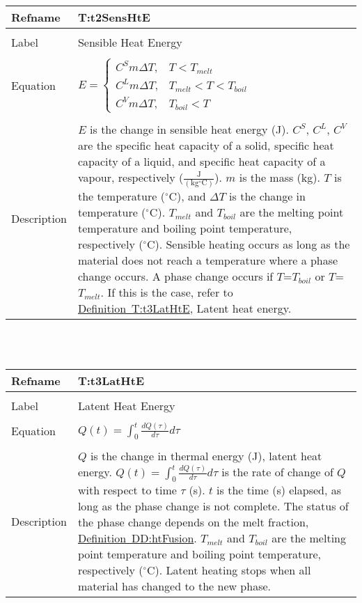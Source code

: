 \documentclass[12pt]{article}
\begin{document}
\noindent \begin{minipage}{\textwidth}
\begin{tabular}{p{} p{}}
\toprule \textbf{Refname} & \textbf{T:t2SensHtE}
\label{T:t2SensHtE}
\\ \midrule \\
Label & Sensible Heat Energy
\\ \midrule \\
Equation & $E=\begin{cases}
{C^{S}} m \Delta{}T, & T<{T_{melt}}\\
{C^{L}} m \Delta{}T, & {T_{melt}}<T<{T_{boil}}\\
{C^{V}} m \Delta{}T, & {T_{boil}}<T
\end{cases}$
\\ \midrule \\
Description & $E$ is the change in sensible heat energy (J). ${C^{S}}$, ${C^{L}}$, ${C^{V}}$ are the specific heat capacity of a solid, specific heat capacity of a liquid, and specific heat capacity of a vapour, respectively ($\frac{\text{J}}{(\text{kg}{}^{\circ}\text{C})}$). $m$ is the mass (kg). $T$ is the temperature (${}^{\circ}$C), and $\Delta{}T$ is the change in temperature (${}^{\circ}$C). ${T_{melt}}$ and ${T_{boil}}$ are the melting point temperature and boiling point temperature, respectively (${}^{\circ}$C). Sensible heating occurs as long as the material does not reach a temperature where a phase change occurs. A phase change occurs if $T$=${T_{boil}}$ or $T$=${T_{melt}}$. If this is the case, refer to \hyperref[T:t3LatHtE]{Definition~T:t3LatHtE}, Latent heat energy.
\\ \bottomrule \end{tabular}
\end{minipage}\\
~\newline
\noindent \begin{minipage}{\textwidth}
\begin{tabular}{p{} p{}}
\toprule \textbf{Refname} & \textbf{T:t3LatHtE}
\label{T:t3LatHtE}
\\ \midrule \\
Label & Latent Heat Energy
\\ \midrule \\
Equation & $Q\left(t\right)=\int_{0}^{t}{\frac{d Q\left(\tau{}\right)}{d \tau{}}d\tau{}}$
\\ \midrule \\
Description & $Q$ is the change in thermal energy (J), latent heat energy. $Q\left(t\right)=\int_{0}^{t}{\frac{d Q\left(\tau{}\right)}{d \tau{}}d\tau{}}$ is the rate of change of $Q$ with respect to time $\tau{}$ (s). $t$ is the time (s) elapsed, as long as the phase change is not complete. The status of the phase change depends on the melt fraction, \hyperref[DD:htFusion]{Definition~DD:htFusion}. ${T_{melt}}$ and ${T_{boil}}$ are the melting point temperature and boiling point temperature, respectively (${}^{\circ}$C). Latent heating stops when all material has changed to the new phase.
\\ \bottomrule \end{tabular}
\end{minipage}\\
\end{document}
